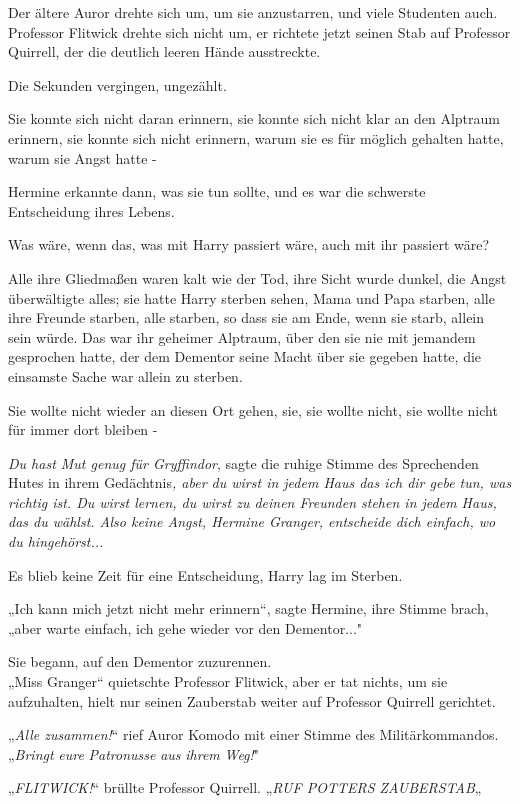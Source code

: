 {Der ältere Auror drehte sich um, um sie anzustarren, und viele Studenten auch. Professor Flitwick drehte sich nicht um, er richtete jetzt seinen Stab auf Professor Quirrell, der die deutlich leeren Hände ausstreckte.

Die Sekunden vergingen, ungezählt.

Sie konnte sich nicht daran erinnern, sie konnte sich nicht klar an den Alptraum erinnern, sie konnte sich nicht erinnern, warum sie es für möglich gehalten hatte, warum sie Angst hatte -

Hermine erkannte dann, was sie tun sollte, und es war die schwerste Entscheidung ihres Lebens.

Was wäre, wenn das, was mit Harry passiert wäre, auch mit ihr passiert wäre?

Alle ihre Gliedmaßen waren kalt wie der Tod, ihre Sicht wurde dunkel, die Angst überwältigte alles; sie hatte Harry sterben sehen, Mama und Papa starben, alle ihre Freunde starben, alle starben, so dass sie am Ende, wenn sie starb, allein sein würde. Das war ihr geheimer Alptraum, über den sie nie mit jemandem gesprochen hatte, der dem Dementor seine Macht über sie gegeben hatte, die einsamste Sache war allein zu sterben.

Sie wollte nicht wieder an diesen Ort gehen, sie, sie wollte nicht, sie wollte nicht für immer dort bleiben -

\emph{Du hast Mut genug für Gryffindor}, sagte die ruhige Stimme des Sprechenden Hutes in ihrem Gedächtnis\emph{, aber du wirst in jedem Haus das ich dir gebe tun, was richtig ist. Du wirst lernen, du wirst zu deinen Freunden stehen in jedem Haus, das du wählst. Also keine Angst, Hermine Granger, entscheide dich einfach, wo du hingehörst...}

Es blieb keine Zeit für eine Entscheidung, Harry lag im Sterben.

„Ich kann mich jetzt nicht mehr erinnern“, sagte Hermine, ihre Stimme brach, „aber warte einfach, ich gehe wieder vor den Dementor..."

Sie begann, auf den Dementor zuzurennen.\\ „Miss Granger“ quietschte Professor Flitwick, aber er tat nichts, um sie aufzuhalten, hielt nur seinen Zauberstab weiter auf Professor Quirrell gerichtet.

„\emph{Alle zusammen!}“ rief Auror Komodo mit einer Stimme des Militärkommandos. „\emph{Bringt} \emph{eure} \emph{Patronusse} \emph{aus} \emph{ihrem} \emph{Weg!}"

„\emph{FLITWICK!}“ brüllte Professor Quirrell. „\emph{RUF POTTERS ZAUBERSTAB}„

}
